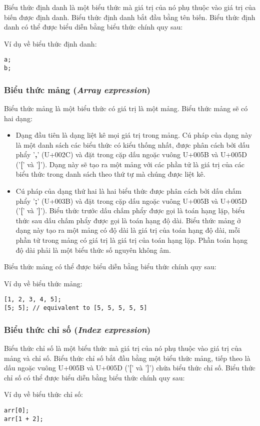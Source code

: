     Biểu thức định danh là một biểu thức mà giá trị của nó phụ thuộc vào giá trị của biến được định danh. Biểu thức định danh bắt đầu bằng tên biến. Biểu thức định danh có thể được biểu diễn bằng biểu thức chính quy sau:

\regexidentexpr

\noindent Ví dụ về biểu thức định danh:
\begin{lstlisting}[]
a;
b;
\end{lstlisting}

\subsubsection{Biểu thức mảng (\textit{Array expression})}
\label{ch2:arrayexpr}

    Biểu thức mảng là một biểu thức có giá trị là một mảng. Biểu thức mảng sẽ có hai dạng:

\begin{itemize}
    \item Dạng đầu tiên là dạng liệt kê mọi giá trị trong mảng. Cú pháp của dạng này là một danh sách các biểu thức có kiểu thống nhất, được phân cách bởi dấu phẩy '\textbf{,}' (U+002C) và đặt trong cặp dấu ngoặc vuông U+005B và U+005D ('\textbf{[}' và '\textbf{]}'). Dạng này sẽ tạo ra một mảng với các phần tử là giá trị của các biểu thức trong danh sách theo thứ tự mà chúng được liệt kê.  
    \item Cú pháp của dạng thứ hai là hai biểu thức được phân cách bởi dấu chấm phẩy '\textbf{;}' (U+003B) và đặt trong cặp dấu ngoặc vuông U+005B và U+005D ('\textbf{[}' và '\textbf{]}'). Biểu thức trước dấu chấm phẩy được gọi là toán hạng lặp, biểu thức sau dấu chấm phẩy được gọi là toán hạng độ dài. Biểu thức mảng ở dạng này tạo ra một mảng có độ dài là giá trị của toán hạng độ dài, mỗi phần tử trong mảng có giá trị là giá trị của toán hạng lặp. Phần toán hạng độ dài phải là một biểu thức số nguyên không âm.
\end{itemize}

    Biểu thức mảng có thể được biểu diễn bằng biểu thức chính quy sau:

\regexarrayexpr

\noindent Ví dụ về biểu thức mảng:
\begin{lstlisting}[]
[1, 2, 3, 4, 5];
[5; 5]; // equivalent to [5, 5, 5, 5, 5]
\end{lstlisting}

\subsubsection{Biểu thức chỉ số (\textit{Index expression})}

    Biểu thức chỉ số là một biểu thức mà giá trị của nó phụ thuộc vào giá trị của mảng và chỉ số. Biểu thức chỉ số bắt đầu bằng một biểu thức mảng, tiếp theo là dấu ngoặc vuông U+005B và U+005D ('\textbf{[}' và '\textbf{]}') chứa biểu thức chỉ số. Biểu thức chỉ số có thể được biểu diễn bằng biểu thức chính quy sau:

\regexindexexpr

\noindent Ví dụ về biểu thức chỉ số:
\begin{lstlisting}[]
arr[0];
arr[1 + 2];
\end{lstlisting}
